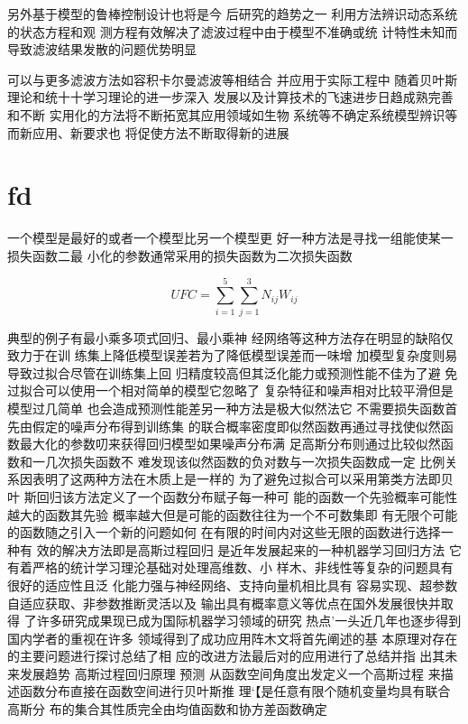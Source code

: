 \documentclass[conference,compsoc]{IEEEtran}
\begin{document}
另外基于模型的鲁棒控制设计也将是今 后研究的趋势之一 利用方法辨识动态系统的状态方程和观 测方程有效解决了滤波过程中由于模型不准确或统 计特性未知而导致滤波结果发散的问题优势明显 
\medskip

可以与更多滤波方法如容积卡尔曼滤波等相结合 并应用于实际工程中 随着贝叶斯理论和统十十学习理论的进一步深入 发展以及计算技术的飞速进步日趋成熟完善和不断 实用化的方法将不断拓宽其应用领域如生物 系统等不确定系统模型辨识等而新应用、新要求也 将促使方法不断取得新的进展

\section{fd}
一个模型是最好的或者一个模型比另一个模型更 好一种方法是寻找一组能使某一损失函数二最 小化的参数通常采用的损失函数为二次损失函数 

\begin{equation}
  UFC = \sum_{i=1}^{5} \sum_{j=1}^{3} N_{ij} W_{ij} \label{eq1}
  \end{equation}

典型的例子有最小乘多项式回归、最小乘神 经网络等这种方法存在明显的缺陷仅致力于在训 练集上降低模型误差若为了降低模型误差而一味增 加模型复杂度则易导致过拟合尽管在训练集上回 归精度较高但其泛化能力或预测性能不佳为了避 免过拟合可以使用一个相对简单的模型它忽略了 复杂特征和噪声相对比较平滑但是模型过几简单 也会造成预测性能差另一种方法是极大似然法它 不需要损失函数首先由假定的噪声分布得到训练集 的联合概率密度即似然函数再通过寻找使似然函 数最大化的参数叨来获得回归模型如果噪声分布满 足高斯分布则通过比较似然函数和一几次损失函数不 难发现该似然函数的负对数与一次损失函数成一定 比例关系因表明了这两种方法在木质上是一样的 为了避免过拟合可以采用第类方法即贝叶 斯回归该方法定义了一个函数分布赋子每一种可 能的函数一个先验概率可能性越大的函数其先验 概率越大但是可能的函数往往为一个不可数集即 有无限个可能的函数随之引入一个新的问题如何 在有限的时间内对这些无限的函数进行选择一种有 效的解决方法即是高斯过程回归 是近年发展起来的一种机器学习回归方法 它有着严格的统计学习理沦基础对处理高维数、小 样木、非线性等复杂的问题具有很好的适应性且泛 化能力强与神经网络、支持向量机相比具有 容易实现、超参数自适应获取、非参数推断灵活以及 输出具有概率意义等优点在国外发展很快并取得 了许多研究成果现已成为国际机器学习领域的研究 热点’一头近几年也逐步得到国内学者的重视在许多 领域得到了成功应用阵木文将首先阐述的基 本原理对存在的主要问题进行探讨总结了相 应的改进方法最后对的应用进行了总结并指 出其未来发展趋势 高斯过程回归原理 预测 从函数空间角度出发定义一个高斯过程 来描述函数分布直接在函数空间进行贝叶斯推 理‘【是任意有限个随机变量均具有联合高斯分 布的集合其性质完全由均值函数和协方差函数确定
\end{document}
